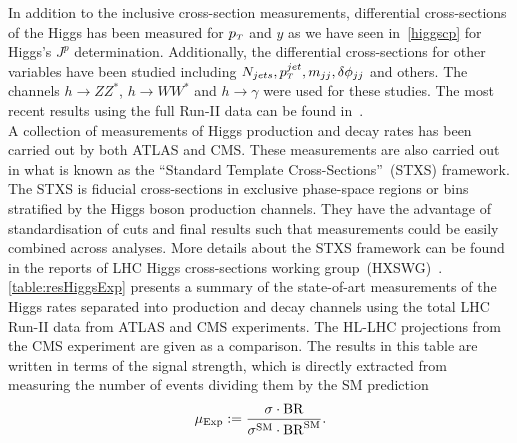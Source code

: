\par In addition to the inclusive cross-section measurements,  differential cross-sections of the Higgs has been measured for $p_{\scriptscriptstyle T}$ and  $y$ as we have seen in~\autoref{higgscp} for Higgs's $J^p$ determination. Additionally,  the differential cross-sections for other variables have been studied including $N_{jets}, p_{\scriptscriptstyle T}^{jet}, m_{jj},\delta \phi_{jj}$ and others.  The channels $ h \to ZZ^*$, $h \to W W^*$ and $ h \to \gamma$ were used for these studies. The most recent results using the full Run-II data can be found in~\cite{CMS:2018gwt,ATLAS:2019jst,ATLAS:2019mju,CMS:2019chr}.  \\
A collection of measurements of Higgs production and decay rates has been carried out by both ATLAS and CMS. These measurements are also carried out in what is known as the ``Standard Template Cross-Sections''~(STXS) framework. The STXS is fiducial cross-sections in exclusive phase-space regions or bins stratified by the Higgs boson production channels. They have the advantage of standardisation of cuts and final results such that measurements could be easily combined across analyses. More details about the STXS framework can be found in the reports of  LHC Higgs cross-sections working group~(HXSWG)~\cite{Berger:2019wnu}.  \autoref{table:resHiggsExp} presents a summary of the state-of-art measurements of the Higgs rates separated into production and decay channels using the total LHC Run-II data from ATLAS and CMS experiments. The HL-LHC projections from the CMS experiment are given as a comparison. The results in this table are written in terms of the signal strength, which is directly extracted from measuring the number of events dividing them by the SM prediction
\begin{equation}
	\mu_{\mathrm{Exp}} := \frac{ \sigma \cdot \mathrm{BR}}{ \sigma^{\mathrm{SM}} \cdot \mathrm{BR}^{\mathrm{SM}}}.
\end{equation}
\newpage
\begingroup
 
\endgroup
\FloatBarrier
